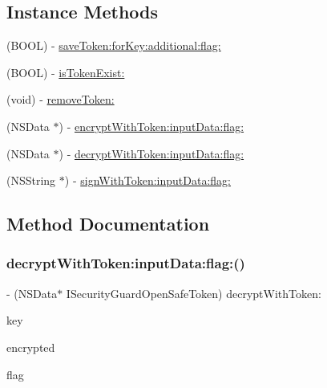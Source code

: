 \subsection*{Instance Methods}
\begin{DoxyCompactItemize}
\item 
(B\+O\+OL) -\/ \mbox{\hyperlink{protocol_i_security_guard_open_safe_token_01-p_a338e40aa027688a3008acb785c8cf401}{save\+Token\+:for\+Key\+:additional\+:flag\+:}}
\item 
(B\+O\+OL) -\/ \mbox{\hyperlink{protocol_i_security_guard_open_safe_token_01-p_a268907dd042f2d04030c8ffdf8a312b5}{is\+Token\+Exist\+:}}
\item 
(void) -\/ \mbox{\hyperlink{protocol_i_security_guard_open_safe_token_01-p_a7221b60a32a5817b8593c019dbbea3cc}{remove\+Token\+:}}
\item 
(N\+S\+Data $\ast$) -\/ \mbox{\hyperlink{protocol_i_security_guard_open_safe_token_01-p_a67008b2b4eb54fff1aea9e663d89459c}{encrypt\+With\+Token\+:input\+Data\+:flag\+:}}
\item 
(N\+S\+Data $\ast$) -\/ \mbox{\hyperlink{protocol_i_security_guard_open_safe_token_01-p_a003506f519acb7f4d825e100d09b0dee}{decrypt\+With\+Token\+:input\+Data\+:flag\+:}}
\item 
(N\+S\+String $\ast$) -\/ \mbox{\hyperlink{protocol_i_security_guard_open_safe_token_01-p_ad746c3459ce7226442ae0f76c175aa4a}{sign\+With\+Token\+:input\+Data\+:flag\+:}}
\end{DoxyCompactItemize}


\subsection{Method Documentation}
\mbox{\label{protocol_i_security_guard_open_safe_token_01-p_a003506f519acb7f4d825e100d09b0dee}} 
\subsubsection{\texorpdfstring{decrypt\+With\+Token\+:input\+Data\+:flag\+:()}{decryptWithToken:inputData:flag:()}}
{\footnotesize\ttfamily -\/ (N\+S\+Data$\ast$ I\+Security\+Guard\+Open\+Safe\+Token) decrypt\+With\+Token\+: \begin{DoxyParamCaption}\item[{(N\+S\+String $\ast$)}]{key }\item[{inputData:(N\+S\+Data $\ast$)}]{encrypted }\item[{flag:(int)}]{flag }\end{DoxyParamCaption}}

